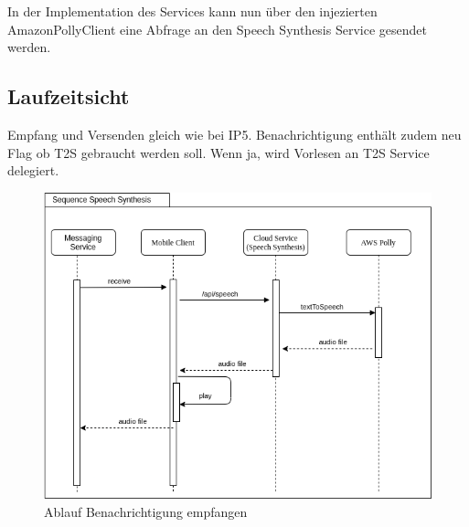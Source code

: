 In der Implementation des Services kann nun über den injezierten AmazonPollyClient eine Abfrage an den Speech Synthesis Service gesendet werden.

\clearpage


\subsection*{Laufzeitsicht}

Empfang und Versenden gleich wie bei IP5.
Benachrichtigung enthält zudem neu Flag ob T2S gebraucht werden soll.
Wenn ja, wird Vorlesen an T2S Service delegiert.

\begin{figure}[h]
    \centering
    \begin{minipage}[b]{0.9\textwidth}
        \includegraphics[width=\textwidth]{graphics/diagramms/Sequence_Speech_Synth_V01}
        \caption{Ablauf Benachrichtigung empfangen}
    \end{minipage}
\end{figure}

\clearpage
